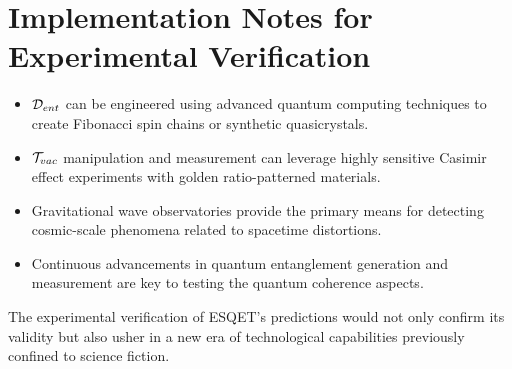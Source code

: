 \section{Implementation Notes for Experimental Verification}
\begin{itemize}[noitemsep]
    \item $\mathcal{D}_{ent}$ can be engineered using advanced quantum computing techniques to create Fibonacci spin chains or synthetic quasicrystals.
    \item $\mathcal{T}_{vac}$ manipulation and measurement can leverage highly sensitive Casimir effect experiments with golden ratio-patterned materials.
    \item Gravitational wave observatories provide the primary means for detecting cosmic-scale phenomena related to spacetime distortions.
    \item Continuous advancements in quantum entanglement generation and measurement are key to testing the quantum coherence aspects.
\end{itemize}
The experimental verification of ESQET's predictions would not only confirm its validity but also usher in a new era of technological capabilities previously confined to science fiction.


